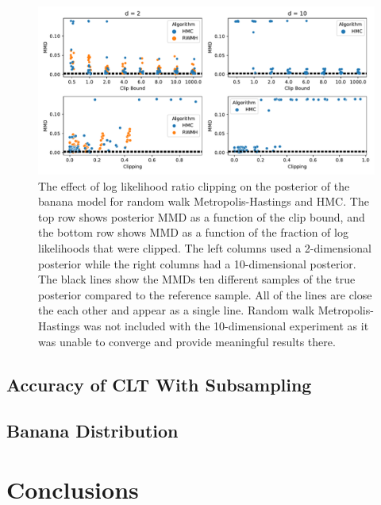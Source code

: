 \documentclass[english,twoside,openright]{HYgraduMLDS}
\begin{document}
\begin{figure}[h]
    \centering
    \includegraphics[width=\textwidth]{figures/clipping.pdf}
    \caption{
        The effect of log likelihood ratio clipping on the posterior of the 
        banana model for random walk Metropolis-Hastings and HMC.
        The top row shows posterior MMD as a function of the clip bound, and 
        the bottom row shows MMD as a function of the fraction of log likelihoods 
        that were clipped. The left columns used a 2-dimensional posterior 
        while the right columns had a 10-dimensional posterior. 
        The black lines show the MMDs ten different samples of the true posterior
        compared to the reference sample. All of the lines are close the each 
        other and appear as a single line.
        Random walk 
        Metropolis-Hastings was not included with the 10-dimensional experiment 
        as it was unable to converge and provide meaningful results there.
    }
    \label{clip_effect_fig}
\end{figure}
\section{Accuracy of CLT With Subsampling}


\section{Banana Distribution}

\chapter{Conclusions}
\end{document}
